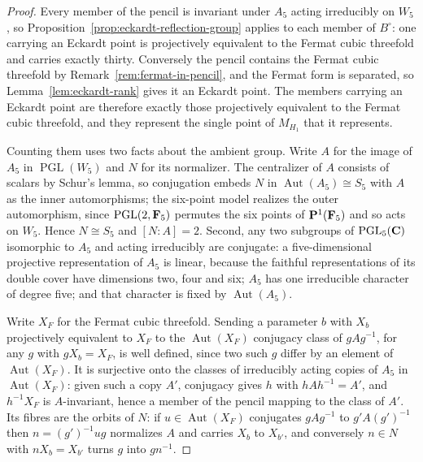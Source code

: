 \begin{proof}
Every member of the pencil is invariant under \(A_5\) acting irreducibly on
\(W_5\), so Proposition~\ref{prop:eckardt-reflection-group} applies to each
member of \(B^\circ\): one carrying an Eckardt point is projectively
equivalent to the Fermat cubic threefold and carries exactly thirty.
Conversely the pencil contains the Fermat cubic threefold by
Remark~\ref{rem:fermat-in-pencil}, and the Fermat form is separated, so
Lemma~\ref{lem:eckardt-rank} gives it an Eckardt point.  The members carrying
an Eckardt point are therefore exactly those projectively equivalent to the
Fermat cubic threefold, and they represent the single point of \(M_{H_1}\)
that it represents.

Counting them uses two facts about the ambient group.  Write \(A\) for the
image of \(A_5\) in \(\operatorname{PGL}(W_5)\) and \(N\) for its normalizer.
The centralizer of \(A\) consists of scalars by Schur's lemma, so conjugation
embeds \(N\) in \(\operatorname{Aut}(A_5)\cong S_5\) with \(A\) as the inner
automorphisms; the six-point model realizes the outer automorphism, since
\(\operatorname{PGL}(2,\mathbf F_5)\) permutes the six points of \(\mathbf P^1(\mathbf F_5)\) and
so acts on \(W_5\).  Hence \(N\cong S_5\) and \([N:A]=2\).  Second, any two
subgroups of \(\operatorname{PGL}_5(\mathbf C)\) isomorphic to \(A_5\) and acting
irreducibly are conjugate: a five-dimensional projective representation of
\(A_5\) is linear, because the faithful representations of its double cover
have dimensions two, four and six; \(A_5\) has one irreducible character of
degree five; and that character is fixed by \(\operatorname{Aut}(A_5)\).

Write \(X_F\) for the Fermat cubic threefold.  Sending a parameter \(b\) with
\(X_b\) projectively equivalent to \(X_F\) to the \(\operatorname{Aut}(X_F)\)
conjugacy class of \(gAg^{-1}\), for any \(g\) with \(gX_b=X_F\), is well
defined, since two such \(g\) differ by an element of
\(\operatorname{Aut}(X_F)\).  It is surjective onto the classes of irreducibly
acting copies of \(A_5\) in \(\operatorname{Aut}(X_F)\): given such a copy
\(A'\), conjugacy gives \(h\) with \(hAh^{-1}=A'\), and \(h^{-1}X_F\) is
\(A\)-invariant, hence a member of the pencil mapping to the class of \(A'\).
Its fibres are the orbits of \(N\): if \(u\in\operatorname{Aut}(X_F)\)
conjugates \(gAg^{-1}\) to \(g'A(g')^{-1}\) then \(n=(g')^{-1}ug\) normalizes
\(A\) and carries \(X_b\) to \(X_{b'}\), and conversely \(n\in N\) with
\(nX_b=X_{b'}\) turns \(g\) into \(gn^{-1}\).


\end{proof}
